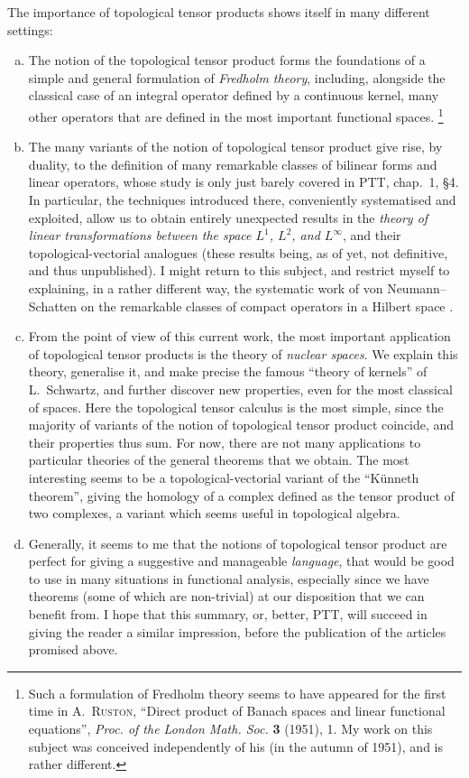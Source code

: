 \documentclass{article}
\theoremstyle{plain}
\newcommand{\oldpage}[1]{\marginpar{\footnotesize$\Big\vert$ \textit{p.~#1}}}
\begin{document}
The importance of topological tensor products shows itself in many different settings:
\begin{enumerate}[a)]
  \item The notion of the topological tensor product forms the foundations of a simple and general formulation of \emph{Fredholm theory}, including, alongside the classical case of an integral operator defined by a continuous kernel, many other operators that are defined in the most important functional spaces.%
    \footnote{Such a formulation of Fredholm theory seems to have appeared for the first time in \textsc{A.~Ruston}, ``Direct product of Banach spaces and linear functional equations'', \emph{Proc. of the London Math. Soc.} \textbf{3} (1951), 1. My work on this subject was conceived independently of his (in the autumn of 1951), and is rather different.}
  \item The many variants of the notion of topological tensor product give rise, by duality, to the definition of many remarkable classes of bilinear forms and linear operators, whose
\oldpage{74}
    study is only just barely covered in PTT, chap.~1, §4.
    In particular, the techniques introduced there, conveniently systematised and exploited, allow us to obtain entirely unexpected results in the \emph{theory of linear transformations between the space $L^1$, $L^2$, and $L^\infty$}, and their topological-vectorial analogues (these results being, as of yet, not definitive, and thus unpublished).
    I might return to this subject, and restrict myself to explaining, in a rather different way, the systematic work of von Neumann--Schatten on the remarkable classes of compact operators in a Hilbert space \cite[chap.~4]{8}.
  \item From the point of view of this current work, the most important application of topological tensor products is the theory of \emph{nuclear spaces}.
    We explain this theory, generalise it, and make precise the famous ``theory of kernels'' of L.~Schwartz, and further discover new properties, even for the most classical of spaces.
    Here the topological tensor calculus is the most simple, since the majority of variants of the notion of topological tensor product coincide, and their properties thus sum.
    For now, there are not many applications to particular theories of the general theorems that we obtain.
    The most interesting seems to be a topological-vectorial variant of the ``K\"{u}nneth theorem'', giving the homology of a complex defined as the tensor product of two complexes, a variant which seems useful in topological algebra.
  \item Generally, it seems to me that the notions of topological tensor product are perfect for giving a suggestive and manageable \emph{language}, that would be good to use in many situations in functional analysis, especially since we have theorems (some of which are non-trivial) at our disposition that we can benefit from.
  I hope that this summary, or, better, PTT, will succeed in giving the reader a similar impression, before the publication of the articles promised above.
\end{enumerate}
\end{document}
